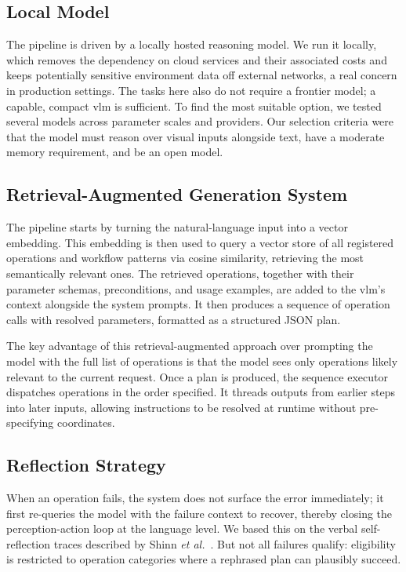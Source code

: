 \subsection{Local Model}\label{sec:local}
The pipeline is driven by a locally hosted reasoning model. We run it locally, which removes the dependency on cloud services and their associated costs and keeps potentially sensitive environment data off external networks, a real concern in production settings. The tasks here also do not require a frontier model; a capable, compact \gls{vlm} is sufficient. To find the most suitable option, we tested several models across parameter scales and providers. Our selection criteria were that the model must reason over visual inputs alongside text, have a moderate memory requirement, and be an open model.

\subsection{Retrieval-Augmented Generation System}\label{sec:rag}
The pipeline starts by turning the natural-language input into a vector embedding. This embedding is then used to query a vector store of all registered operations and workflow patterns via cosine similarity, retrieving the most semantically relevant ones. The retrieved operations, together with their parameter schemas, preconditions, and usage examples, are added to the \gls{vlm}’s context alongside the system prompts. It then produces a sequence of operation calls with resolved parameters, formatted as a structured JSON plan.

The key advantage of this retrieval-augmented approach over prompting the model with the full list of operations is that the model sees only operations likely relevant to the current request. Once a plan is produced, the sequence executor dispatches operations in the order specified. It threads outputs from earlier steps into later inputs, allowing instructions to be resolved at runtime without pre-specifying coordinates.

\subsection{Reflection Strategy}\label{sec:reflection}
When an operation fails, the system does not surface the error immediately; it first re-queries the model with the failure context to recover, thereby closing the perception-action loop at the language level. We based this on the verbal self-reflection traces described by Shinn \emph{et al.}~\cite{shinn2023reflexionlanguageagentsverbal}. But not all failures qualify: eligibility is restricted to operation categories where a rephrased plan can plausibly succeed.


